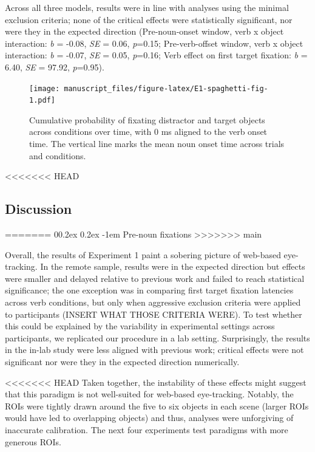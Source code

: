 \documentclass[
  man,floatsintext]{apa6}
\makeatletter
\let\oldparagraph\paragraph
\renewcommand{\paragraph}[1]{\oldparagraph{#1}\mbox{}}
\renewcommand{\paragraph}{\@startsection{paragraph}{4}{\parindent}%
  {0\baselineskip \@plus 0.2ex \@minus 0.2ex}%
  {-1em}%
  {\normalfont\normalsize\bfseries\itshape\typesectitle}}
\makeatother
\begin{document}
Across all three models, results were in line with analyses using the minimal exclusion criteria; none of the critical effects were statistically significant, nor were they in the expected direction (Pre-noun-onset window, verb x object interaction: \emph{b} = -0.08, \emph{SE} = 0.06, \emph{p}=0.15; Pre-verb-offset window, verb x object interaction: \emph{b} = -0.07, \emph{SE} = 0.05, \emph{p}=0.16; Verb effect on first target fixation: \emph{b} = 6.40, \emph{SE} = 97.92, \emph{p}=0.95).

\begin{figure}
\centering
\texttt{[image: manuscript\_files/figure-latex/E1-spaghetti-fig-1.pdf]}
\caption{\label{fig:E1-spaghetti-fig}Cumulative probability of fixating distractor and target objects across conditions over time, with 0 ms aligned to the verb onset time. The vertical line marks the mean noun onset time across trials and conditions.}
\end{figure}

<<<<<<< HEAD
\subsection{Discussion}\label{discussion}
=======
\paragraph{Pre-noun fixations}\label{pre-noun-fixations}
>>>>>>> main

Overall, the results of Experiment 1 paint a sobering picture of web-based eye-tracking. In the remote sample, results were in the expected direction but effects were smaller and delayed relative to previous work and failed to reach statistical significance; the one exception was in comparing first target fixation latencies across verb conditions, but only when aggressive exclusion criteria were applied to participants (INSERT WHAT THOSE CRITERIA WERE). To test whether this could be explained by the variability in experimental settings across participants, we replicated our procedure in a lab setting. Surprisingly, the results in the in-lab study were less aligned with previous work; critical effects were not significant nor were they in the expected direction numerically.

<<<<<<< HEAD
Taken together, the instability of these effects might suggest that this paradigm is not well-suited for web-based eye-tracking. Notably, the ROIs were tightly drawn around the five to six objects in each scene (larger ROIs would have led to overlapping objects) and thus, analyses were unforgiving of inaccurate calibration. The next four experiments test paradigms with more generous ROIs.
\end{document}
